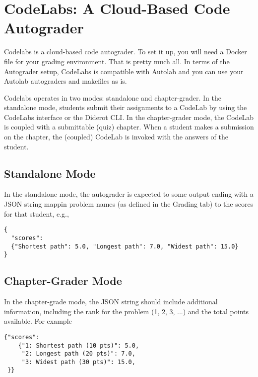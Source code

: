 \chapter{CodeLabs: A Cloud-Based Code Autograder}
\label{ch:codelabs}

Codelabs is a cloud-based code autograder.  To set it up, you will
need a Docker file for your grading environment.  That is pretty much
all.  In terms of the Autograder setup, CodeLabs is compatible with
Autolab and you can use your Autolab autograders and makefiles as is.

Codelabs operates in two modes: standalone and chapter-grader. 
%
In the standalone mode, students submit their assignments to a CodeLab
by using the CodeLabs interface or the Diderot CLI.
%
In the chapter-grader mode, the CodeLab is coupled with a submittable
(quiz) chapter.
%
When a student makes a submission on the chapter, the (coupled) CodeLab is invoked with the answers of the student.

\section{Standalone Mode}
\label{sec:codelabs::standalone}

\begin{gram}
\label{sec:codelabs::standalone::output}

In the standalone mode, the autograder is expected to some output ending with a JSON string mappin problem names (as defined in the Grading tab) to the scores for that student, e.g.,
  
\begin{lstlisting}
{
  "scores":
  {"Shortest path": 5.0, "Longest path": 7.0, "Widest path": 15.0}
}
\end{lstlisting}
  
\end{gram}


\section{Chapter-Grader Mode}
\label{sec:codelabs::chapter}

\begin{gram}
\label{sec:codelabs::chapter::output}
  
In the chapter-grade mode, the JSON string should include additional information, including the rank for the problem (1, 2, 3, ...) and the total points available.  For example

\begin{lstlisting}
{"scores":
    {"1: Shortest path (10 pts)": 5.0,
     "2: Longest path (20 pts)": 7.0,
     "3: Widest path (30 pts)": 15.0,
 }}
\end{lstlisting}
\end{gram}
